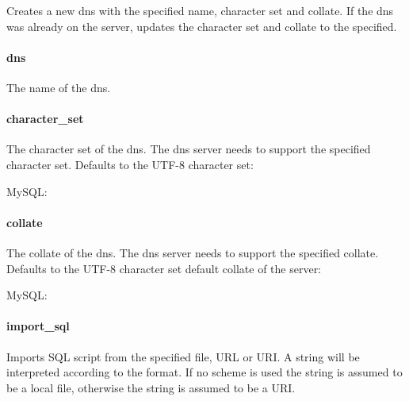 Creates a new dns with the specified name, character set and collate.
If the dns was already on the server, updates the character set and collate
to the specified.

\paragraph{dns}


The name of the dns.

\paragraph{character\_set}


The character set of the dns. The dns server needs to support the
specified character set.
Defaults to the UTF-8 character set:

\begin{compactitem}
\item MySQL: 
\end{compactitem}

\paragraph{collate}


The collate of the dns. The dns server needs to support the
specified collate. Defaults to the UTF-8 character set default collate of
the server:

\begin{compactitem}
\item MySQL: 
\end{compactitem}

\paragraph{import\_sql}


Imports SQL script from the specified file, URL or URI. A string will be
interpreted according to the format. If no scheme is used the string
is assumed to be a local file, otherwise the string is assumed to be a URI.


